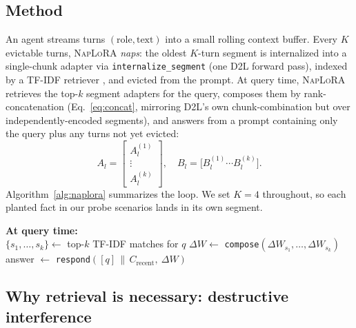 \documentclass[11pt]{article}
\newcommand{\DTL}{D2L}
\newcommand{\naplora}{\textsc{NapLoRA}}
\newcommand{\mt}[1]{\texttt{\small #1}}
\begin{document}
\subsection{Method}

An agent streams turns $(\text{role}, \text{text})$ into a small rolling context buffer. Every $K$ evictable turns, \naplora{} \emph{naps}: the oldest $K$-turn segment is internalized into a single-chunk adapter via \mt{internalize\_segment} (one \DTL{} forward pass), indexed by a TF-IDF retriever \citep{salton1988termweighting}, and evicted from the prompt. At query time, \naplora{} retrieves the top-$k$ segment adapters for the query, composes them by rank-concatenation (Eq.~\ref{eq:concat}, mirroring \DTL{}'s own chunk-combination but over independently-encoded segments), and answers from a prompt containing only the query plus any turns not yet evicted:
\begin{equation}
A_l=\begin{bmatrix}A_l^{(1)}\\\vdots\\A_l^{(k)}\end{bmatrix},\quad B_l = \big[B_l^{(1)} \cdots B_l^{(k)}\big].
\label{eq:concat}
\end{equation}
Algorithm~\ref{alg:naplora} summarizes the loop. We set $K=4$ throughout, so each planted fact in our probe scenarios lands in its own segment.

\begin{algorithm}[t]
\caption{\naplora{} streaming memory}
\label{alg:naplora}
\SetAlgoLined
{}
\textbf{At query time:}\\
$\{s_1,\dots,s_k\} \gets$ top-$k$ TF-IDF matches for $q$\;
$\Delta W \gets$ \texttt{compose}$(\Delta W_{s_1},\dots,\Delta W_{s_k})$ 
answer $\gets$ \texttt{respond}$([q] \,\|\, C_{\text{recent}},\ \Delta W)$\;
\end{algorithm}

\subsection{Why retrieval is necessary: destructive interference}
\label{sec:interference}
\end{document}
